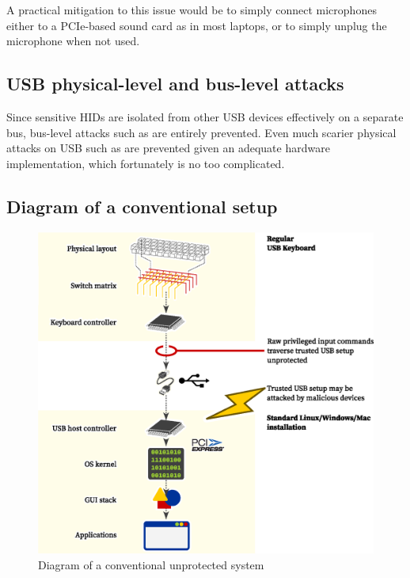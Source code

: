 \documentclass[12pt,a4paper,notitlepage]{article}
\begin{document}
A practical mitigation to this issue would be to simply connect microphones either to a PCIe-based sound card as in most
laptops, or to simply unplug the microphone when not used.

\subsection{USB physical-level and bus-level attacks}
Since sensitive HIDs are isolated from other USB devices effectively on a separate bus, bus-level attacks such as
\textcite{neugschwandtner01} are entirely prevented. Even much scarier physical attacks on USB such as \textcite{su01}
are prevented given an adequate hardware implementation, which fortunately is no too complicated.

\subsection{Diagram of a conventional setup}
\begin{figure}[H]
    \includegraphics[scale=0.8]{system_diagram_without_secureusb.eps}
    \caption{Diagram of a conventional unprotected system}
    \label{diagram_without}
\end{figure}
\end{document}
